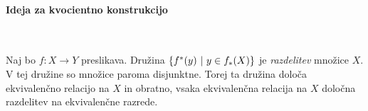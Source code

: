 \paragraph{Ideja za kvocientno konstrukcijo} \ 

Naj bo \(f: X \to Y\) preslikava. Družina \(\left\{f^{*}(y) \ | \ y \in f_{*}(X)\right\}\) je \emph{razdelitev} množice \(X\). V tej družine so množice paroma disjunktne. Torej ta družina določa ekvivalenčno relacijo na \(X\) in obratno, vsaka ekvivalenčna relacija na \(X\) določna razdelitev na ekvivalenčne razrede.  